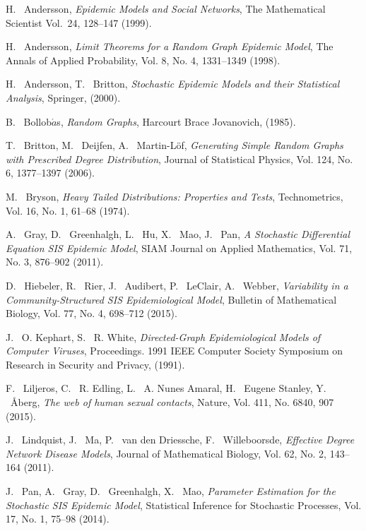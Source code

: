 \documentclass{uonmathsreport}
\begin{document}
\newpage
\begin{thebibliography}{99} %

H. ~Andersson,
{\it Epidemic Models and Social Networks\/},
The Mathematical Scientist Vol.~24, 
128--147
(1999).

H. ~Andersson,
{\it Limit Theorems for a Random Graph Epidemic Model\/},
The Annals of Applied Probability,
 Vol. 8, No. 4, 1331--1349 
(1998).

H. ~Andersson, T. ~Britton,
{\it Stochastic Epidemic Models and their Statistical Analysis\/},
Springer,
(2000).

B. ~Bollob$\acute{a}$s,
{\it Random Graphs\/}, 
Harcourt Brace Jovanovich,
(1985).

T. ~Britton, M. ~Deijfen, A. ~Martin-Löf,
{\it Generating Simple Random Graphs with Prescribed Degree Distribution\/},
Journal of Statistical Physics,
 Vol. 124, No. 6, 1377–1397 
(2006).

M. ~Bryson,
{\it Heavy Tailed Distributions: Properties and Tests\/},
Technometrics,
 Vol. 16, No. 1, 61--68 
(1974).

A. ~Gray, D. ~Greenhalgh, L. ~Hu, X. ~Mao, J. ~Pan,
{\it A Stochastic Differential Equation SIS Epidemic Model\/},
SIAM Journal on Applied Mathematics,
 Vol. 71, No. 3, 876–902 
(2011).

D. ~Hiebeler, R. ~Rier, J. ~Audibert, P. ~LeClair, A. ~Webber,
{\it Variability in a Community-Structured SIS Epidemiological Model\/},
Bulletin of Mathematical Biology,
 Vol. 77, No. 4, 698–712 
(2015).

J. ~O. Kephart, S. ~R. White, 
{\it Directed-Graph Epidemiological Models of Computer Viruses\/},
Proceedings. 1991 IEEE Computer Society Symposium on Research in Security and Privacy,
(1991).

F. ~Liljeros, C. ~R. Edling, L. ~A. Nunes Amaral, H. ~Eugene Stanley, Y. ~Åberg,
{\it The web of human sexual contacts\/},
Nature,
 Vol. 411, No. 6840, 907 
(2015).

J. ~Lindquist, J. ~Ma, P. ~van den Driessche, F. ~Willeboorsde,
{\it Effective Degree Network Disease Models\/},
Journal of Mathematical Biology,
 Vol. 62, No. 2, 143--164
(2011).

J. ~Pan, A. ~Gray, D. ~Greenhalgh, X. ~Mao,
{\it Parameter Estimation for the Stochastic SIS Epidemic Model\/},
Statistical Inference for Stochastic Processes,
 Vol. 17, No. 1, 75--98
(2014).


\end{thebibliography}
\end{document}
